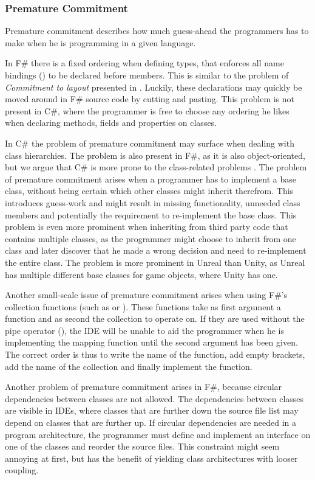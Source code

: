 \subsubsection{Premature Commitment}
Premature commitment describes how much guess-ahead the programmers has to make when he is programming in a given language. 

In F\# there is a fixed ordering when defining types, that enforces all name bindings () to be declared before members. This is similar to the problem of \textit{Commitment to layout} presented in \cite{green1996usability}. Luckily, these declarations may quickly be moved around in F\# source code by cutting and pasting. This problem is not present in C\#, where the programmer is free to choose any ordering he likes when declaring methods, fields and properties on classes.

In C\# the problem of premature commitment may surface when dealing with class hierarchies. The problem is also present in F\#, as it is also object-oriented, but we argue that C\# is more prone to the class-related problems . The problem of premature commitment arises when a programmer has to implement a base class, without being certain which other classes might inherit therefrom. This introduces guess-work and might result in missing functionality, unneeded class members and potentially the requirement to re-implement the base class. This problem is even more prominent when inheriting from third party code that contains multiple classes, as the programmer might choose to inherit from one class and later discover that he made a wrong decision and need to re-implement the entire class. The problem is more prominent in Unreal than Unity, as Unreal has multiple different base classes for game objects\needcite, where Unity has one.

Another small-scale issue of premature commitment arises when using F\#'s collection functions (such as  or ). These functions take as first argument a function and as second the collection to operate on. If they are used without the pipe operator (\ttt{|\textgreater}), the \gls{IDE} will be unable to aid the programmer when he is implementing the mapping function until the second argument has been given. The correct order is thus to write the name of the function, add empty brackets, add the name of the collection and finally implement the function.

Another problem of premature commitment arises in F\#, because circular dependencies between classes are not allowed. The dependencies between classes are visible in \glspl{IDE}, where classes that are further down the source file list may depend on classes that are further up. If circular dependencies are needed in a program architecture, the programmer must define and implement an interface on one of the classes and reorder the source files. This constraint might seem annoying at first, but has the benefit of yielding class architectures with looser coupling\cite{interfaces:and:coupling}. 